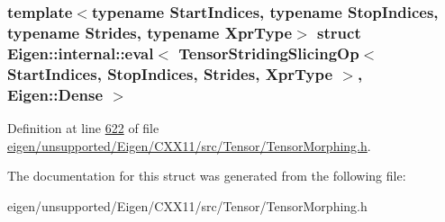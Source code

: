 \subsubsection*{template$<$typename Start\+Indices, typename Stop\+Indices, typename Strides, typename Xpr\+Type$>$\newline
struct Eigen\+::internal\+::eval$<$ Tensor\+Striding\+Slicing\+Op$<$ Start\+Indices, Stop\+Indices, Strides, Xpr\+Type $>$, Eigen\+::\+Dense $>$}



Definition at line \hyperlink{eigen_2unsupported_2_eigen_2_c_x_x11_2src_2_tensor_2_tensor_morphing_8h_source_l00622}{622} of file \hyperlink{eigen_2unsupported_2_eigen_2_c_x_x11_2src_2_tensor_2_tensor_morphing_8h_source}{eigen/unsupported/\+Eigen/\+C\+X\+X11/src/\+Tensor/\+Tensor\+Morphing.\+h}.



The documentation for this struct was generated from the following file\+:\begin{DoxyCompactItemize}
\item 
eigen/unsupported/\+Eigen/\+C\+X\+X11/src/\+Tensor/\+Tensor\+Morphing.\+h\end{DoxyCompactItemize}
